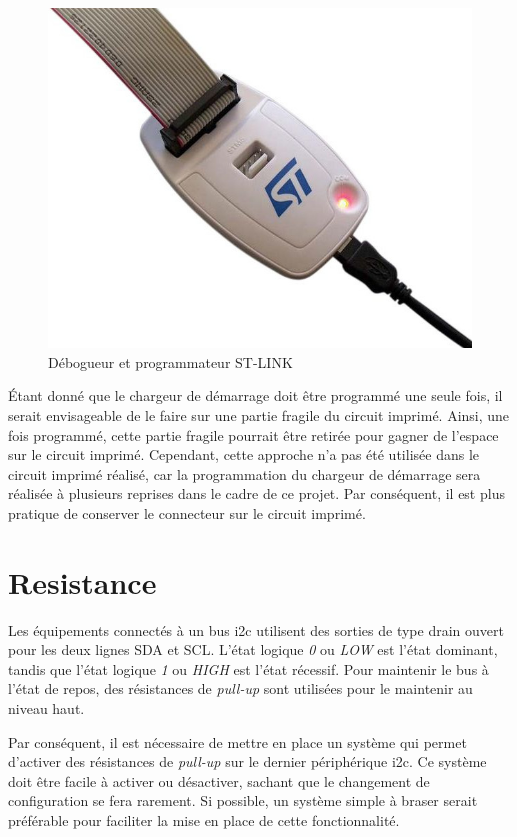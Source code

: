 \begin{figure}[H]
    \centering
    \includegraphics[scale=0.3]{./assets/figures/st_link.jpg}
    \caption{\cite{st_link} Débogueur et programmateur ST-LINK}
\end{figure}

Étant donné que le chargeur de démarrage doit être programmé une seule fois, il serait envisageable de le faire sur une partie fragile du circuit imprimé.
Ainsi, une fois programmé, cette partie fragile pourrait être retirée pour gagner de l'espace sur le circuit imprimé.
Cependant, cette approche n'a pas été utilisée dans le circuit imprimé réalisé, car la programmation du chargeur de démarrage sera réalisée à plusieurs reprises dans le cadre de ce projet.
Par conséquent, il est plus pratique de conserver le connecteur sur le circuit imprimé.

\section{Resistance}

Les équipements connectés à un bus \gls{i2c} utilisent des sorties de type drain ouvert pour les deux lignes SDA et SCL.
L'état logique \textit{0} ou \textit{LOW} est l'état dominant, tandis que l'état logique \textit{1} ou \textit{HIGH} est l'état récessif.
Pour maintenir le bus à l'état de repos, des résistances de \textit{pull-up} sont utilisées pour le maintenir au niveau haut.

Par conséquent, il est nécessaire de mettre en place un système qui permet d'activer des résistances de \textit{pull-up} sur le dernier périphérique \gls{i2c}.
Ce système doit être facile à activer ou désactiver, sachant que le changement de configuration se fera rarement.
Si possible, un système simple à braser serait préférable pour faciliter la mise en place de cette fonctionnalité.

